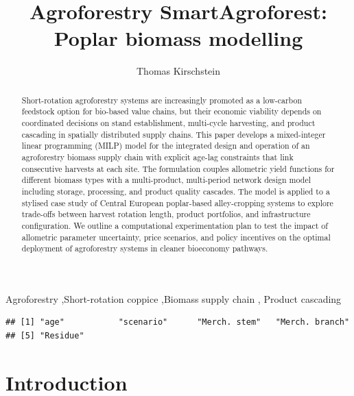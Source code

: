 \documentclass[preprint,review,1p,authoryear]{elsarticle} %
\begin{document}
\begin{frontmatter}

  \title{Agroforestry SmartAgroforest: Poplar biomass modelling}
    \author[Fraunhofer IKTS, Dresden, Germany]{Thomas Kirschstein%
  }
  
  \begin{abstract}
  Short-rotation agroforestry systems are increasingly promoted as a low-carbon feedstock option for bio-based value chains, but their economic viability depends on coordinated decisions on stand establishment, multi-cycle harvesting, and product cascading in spatially distributed supply chains. This paper develops a mixed-integer linear programming (MILP) model for the integrated design and operation of an agroforestry biomass supply chain with explicit age-lag constraints that link consecutive harvests at each site. The formulation couples allometric yield functions for different biomass types with a multi-product, multi-period network design model including storage, processing, and product quality cascades. The model is applied to a stylised case study of Central European poplar-based alley-cropping systems to explore trade-offs between harvest rotation length, product portfolios, and infrastructure configuration. We outline a computational experimentation plan to test the impact of allometric parameter uncertainty, price scenarios, and policy incentives on the optimal deployment of agroforestry systems in cleaner bioeconomy pathways.
  \end{abstract}
    \begin{keyword}
    Agroforestry \sep Short-rotation coppice \sep Biomass supply chain \sep 
    Product cascading
  \end{keyword}
  
 \end{frontmatter}

\begin{verbatim}
## [1] "age"           "scenario"      "Merch. stem"   "Merch. branch"
## [5] "Residue"
\end{verbatim}

\section{Introduction}\label{introduction}
\end{document}
